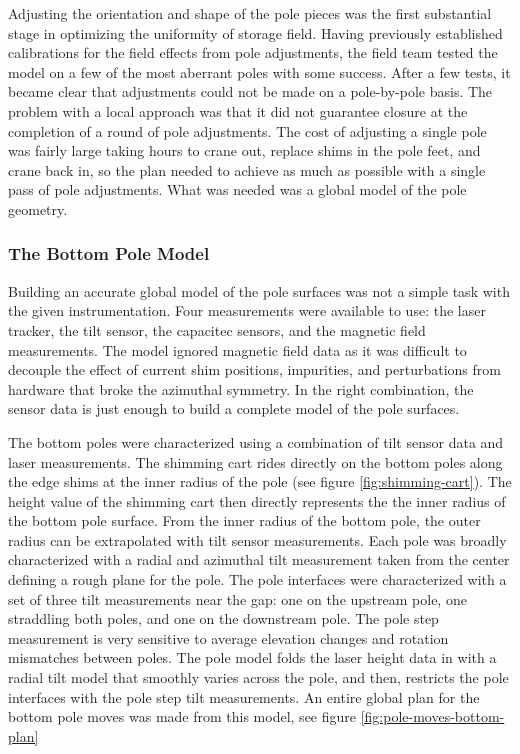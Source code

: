 Adjusting the orientation and shape of the pole pieces was the first substantial stage in optimizing the uniformity of \gmtwo storage field.  Having previously established calibrations for the field effects from pole adjustments, the \gmtwo field team tested the model on a few of the most aberrant poles with some success.  After a few tests, it became clear that adjustments could not be made on a pole-by-pole basis.  The problem with a local approach was that it did not guarantee closure at the completion of a round of pole adjustments.  The cost of adjusting a single pole was fairly large taking hours to crane out, replace shims in the pole feet, and crane back in, so the plan needed to achieve as much as possible with a single pass of pole adjustments.  What was needed was a global model of the pole geometry.

\subsubsection{The Bottom Pole Model}

Building an accurate global model of the pole surfaces was not a simple task with the given instrumentation.  Four measurements were available to use: the laser tracker, the tilt sensor, the capacitec sensors, and the magnetic field measurements.  The model ignored magnetic field data as it was difficult to decouple the effect of current shim positions, impurities, and perturbations from hardware that broke the azimuthal symmetry.  In the right combination, the sensor data is just enough to build a complete model of the pole surfaces.

The bottom poles were characterized using a combination of tilt sensor data and laser measurements.  The shimming cart rides directly on the bottom poles along the edge shims at the inner radius of the pole (see figure \ref{fig:shimming-cart}). The height value of the shimming cart then directly represents the the inner radius of the bottom pole surface.  From the inner radius of the bottom pole, the outer radius can be extrapolated with tilt sensor measurements.  Each pole was broadly characterized with a radial and azimuthal tilt measurement taken from the center defining a rough plane for the pole.  The pole interfaces were characterized with a set of three tilt measurements near the gap: one on the upstream pole, one straddling both poles, and one on the downstream pole.  The pole step measurement is very sensitive to average elevation changes and rotation mismatches between poles.  The pole model folds the laser height data in with a radial tilt model that smoothly varies across the pole, and then, restricts the pole interfaces with the pole step tilt measurements.  An entire global plan for the bottom pole moves was made from this model, see figure \ref{fig:pole-moves-bottom-plan}

